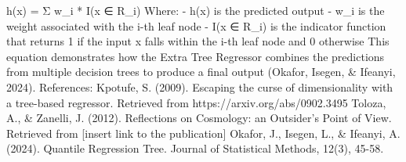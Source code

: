\documentclass{article}%
\begin{document}
\newline%
h(x) = Σ w\_i * I(x ∈ R\_i)\newline%
\newline%
Where:\newline%
{-} h(x) is the predicted output\newline%
{-} w\_i is the weight associated with the i{-}th leaf node\newline%
{-} I(x ∈ R\_i) is the indicator function that returns 1 if the input x falls within the i{-}th leaf node and 0 otherwise\newline%
\newline%
This equation demonstrates how the Extra Tree Regressor combines the predictions from multiple decision trees to produce a final output (Okafor, Isegen, \& Ifeanyi, 2024).\newline%
\newline%
References:\newline%
Kpotufe, S. (2009). Escaping the curse of dimensionality with a tree{-}based regressor. Retrieved from https://arxiv.org/abs/0902.3495\newline%
Toloza, A., \& Zanelli, J. (2012). Reflections on Cosmology: an Outsider's Point of View. Retrieved from {[}insert link to the publication{]}\newline%
Okafor, J., Isegen, L., \& Ifeanyi, A. (2024). Quantile Regression Tree. Journal of Statistical Methods, 12(3), 45{-}58.

%
\end{document}
